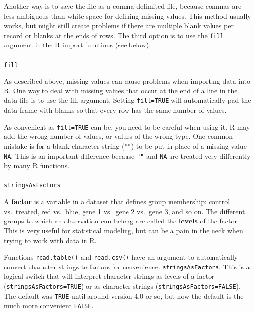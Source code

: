 \documentclass[
  13,
  letterpaper,
]{report}
\makeatletter
\let\oldparagraph\paragraph
\renewcommand{\paragraph}{
    \@ifstar
      \xxxParagraphStar
      \xxxParagraphNoStar
  }
\newcommand{\xxxParagraphStar}[1]{\oldparagraph*{#1}\mbox{}}
\newcommand{\xxxParagraphNoStar}[1]{\oldparagraph{#1}\mbox{}}
\makeatother
\begin{document}
Another way is to save the file as a comma-delimited file, because
commas are less ambiguous than white space for defining missing values.
This method usually works, but might still create problems if there are
multiple blank values per record or blanks at the ends of rows. The
third option is to use the \texttt{fill} argument in the R import
functions (see below).

\paragraph{\texorpdfstring{\texttt{fill}}{fill}}\label{fill}

As described above, missing values can cause problems when importing
data into R. One way to deal with missing values that occur at the end
of a line in the data file is to use the fill argument. Setting
\texttt{fill=TRUE} will automatically pad the data frame with blanks so
that every row has the same number of values.

As convenient as \texttt{fill=TRUE} can be, you need to be careful when
using it. R may add the wrong number of values, or values of the wrong
type. One common mistake is for a blank character string (\texttt{""})
to be put in place of a missing value \texttt{NA}. This is an important
difference because \texttt{""} and \texttt{NA} are treated very
differently by many R functions.

\paragraph{\texorpdfstring{\texttt{stringsAsFactors}}{stringsAsFactors}}\label{stringsasfactors}

A \textbf{factor} is a variable in a dataset that defines group
membership: control vs.~treated, red vs.~blue, gene 1 vs.~gene 2
vs.~gene 3, and so on. The different groups to which an observation can
belong are called the \textbf{levels} of the factor. This is very useful
for statistical modeling, but can be a pain in the neck when trying to
work with data in R.

Functions \texttt{read.table()} and \texttt{read.csv()} have an argument
to automatically convert character strings to factors for convenience:
\texttt{stringsAsFactors}. This is a logical switch that will interpret
character strings as levels of a factor (\texttt{stringsAsFactors=TRUE})
or as character strings (\texttt{stringsAsFactors=FALSE}). The default
was \texttt{TRUE} until around version 4.0 or so, but now the default is
the much more convenient \texttt{FALSE}.
\end{document}
